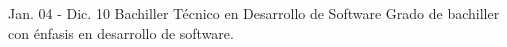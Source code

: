 \documentclass[]{cv-class}
\begin{document}
\begin{entrylist}
	\entry
	{Jan. 04 - Dic. 10}
	{Bachiller Técnico en Desarrollo de Software}
	{ }
	{Grado de bachiller con énfasis en desarrollo de software.}
	

\end{entrylist}
\end{document}
